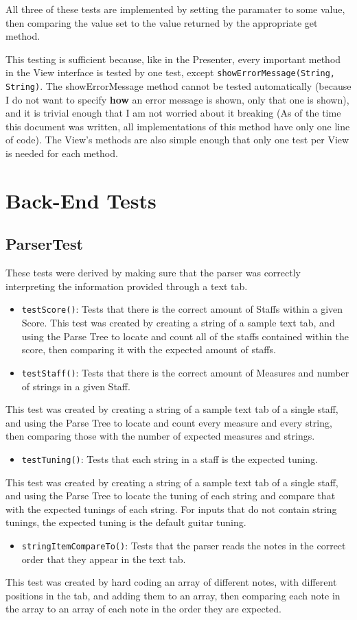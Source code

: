 \documentclass[11pt]{article}
\begin{document}
All three of these tests are implemented by setting the paramater to some value, then comparing the value set to the value returned by the appropriate get method.

This testing is sufficient because, like in the Presenter, every important method in the View interface is tested by one test, except \texttt{showErrorMessage(String, String)}.  The showErrorMessage method cannot be tested automatically (because I do not want to specify \textbf{how} an error message is shown, only that one is shown), and it is trivial enough that I am not worried about it breaking (As of the time this document was written, all implementations of this method have only one line of code).  The View's methods are also simple enough that only one test per View is needed for each method.
\newpage

\section{Back-End Tests}
\label{sec:orgd52a181}
\subsection{ParserTest}
\label{sec:org1ec1eb1}
These tests were derived by making sure that the parser was correctly interpreting the information provided through a text tab.
\begin{itemize}
\item \texttt{testScore()}: Tests that there is the correct amount of Staffs within a given Score.
This test was created by creating a string of a sample text tab, and using the Parse Tree to locate and count all of the staffs contained within the score, then comparing it with the expected amount of staffs.
\item \texttt{testStaff()}: Tests that there is the correct amount of Measures and number of strings in a given Staff.
\end{itemize}
This test was created by creating a string of a sample text tab of a single staff, and using the Parse Tree to locate and count every measure and every string, then comparing those with the number of expected measures and strings.
\begin{itemize}
\item \texttt{testTuning()}: Tests that each string in a staff is the expected tuning.
\end{itemize}
This test was created by creating a string of a sample text tab of a single staff, and using the Parse Tree to locate the tuning of each string and compare that with the expected tunings of each string. For inputs that do not contain string tunings, the expected tuning is the default guitar tuning.
\begin{itemize}
\item \texttt{stringItemCompareTo()}: Tests that the parser reads the notes in the correct order that they appear in the text tab.
\end{itemize}
This test was created by hard coding an array of different notes, with different positions in the tab, and adding them to an array, then comparing each note in the array to an array of each note in the order they are expected.
\end{document}
